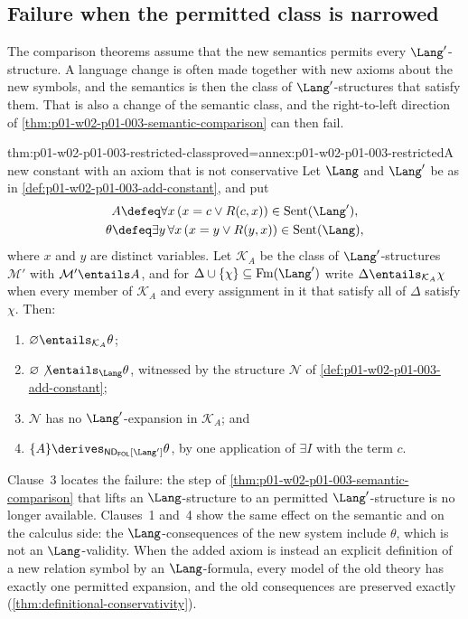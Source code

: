 \subsection{Failure when the permitted class is narrowed}
\label{sec:p01-w02-p01-003-failure}

The comparison theorems assume that the new semantics permits every
\(\Lang'\)-structure. A language change is often made together with new
axioms about the new symbols, and the semantics is then the class of
\(\Lang'\)-structures that satisfy them. That is also a change of the
semantic class, and the right-to-left direction of
\cref{thm:p01-w02-p01-003-semantic-comparison} can then fail.

\begin{hblemma}{thm:p01-w02-p01-003-restricted-class}{proved=annex:p01-w02-p01-003-restricted}{A new constant with an axiom that is not conservative}
Let \(\Lang\) and \(\Lang'\) be as in
\cref{def:p01-w02-p01-003-add-constant}, and put
\begin{gather*}
 A\defeq\forall x\,(x=c\lor R(c,x))\in\operatorname{Sent}(\Lang'),\\
 \theta\defeq\exists y\,\forall x\,(x=y\lor R(y,x))\in\operatorname{Sent}(\Lang),
\end{gather*}
where \(x\) and \(y\) are distinct variables. Let \(\mathcal K_A\) be the
class of \(\Lang'\)-structures \(\mathcal M'\) with
\(\mathcal M'\entails A\), and for
\(\Delta\cup\{\chi\}\subseteq\operatorname{Fm}(\Lang')\) write
\(\Delta\entails_{\mathcal K_A}\chi\) when every member of
\(\mathcal K_A\) and every assignment in it that satisfy all of \(\Delta\)
satisfy \(\chi\). Then:
\begin{enumerate}
  \item \(\varnothing\entails_{\mathcal K_A}\theta\);
  \item \(\varnothing\not\entails_{\Lang}\theta\), witnessed by the
        structure \(\mathcal N\) of \cref{def:p01-w02-p01-003-add-constant};
  \item \(\mathcal N\) has no \(\Lang'\)-expansion in \(\mathcal K_A\); and
  \item \(\{A\}\derives_{\mathsf{ND}_{\mathsf{FOL}}[\Lang']}\theta\), by one
        application of \(\exists I\) with the term \(c\).
\end{enumerate}
\end{hblemma}

Clause~3 locates the failure: the step of
\cref{thm:p01-w02-p01-003-semantic-comparison} that lifts an
\(\Lang\)-structure to an permitted \(\Lang'\)-structure is no longer
available. Clauses~1 and~4 show the same effect on the semantic and on the
calculus side: the \(\Lang\)-consequences of the new system include
\(\theta\), which is not an \(\Lang\)-validity. When the added axiom is
instead an explicit definition of a new relation symbol by an
\(\Lang\)-formula, every model of the old theory has exactly one permitted
expansion, and the old consequences are preserved exactly
(\cref{thm:definitional-conservativity}).

